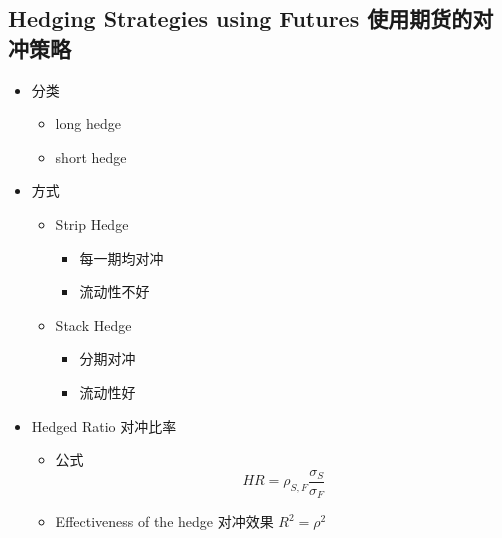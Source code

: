 \documentclass[a4paper,6pt,twoside,openany]{article}
\begin{document}
\subsection{Hedging Strategies using Futures 使用期货的对冲策略}
\begin{itemize}
\item 分类
  \begin{itemize}
  \item long hedge
  \item short hedge
  \end{itemize}
\item 方式
  \begin{itemize}
  \item Strip Hedge
    \begin{itemize}
    \item 每一期均对冲
    \item 流动性不好
    \end{itemize}
  \item Stack Hedge
    \begin{itemize}
    \item 分期对冲
    \item 流动性好
    \end{itemize}
  \end{itemize}
\item Hedged Ratio 对冲比率
  \begin{itemize}
  \item 公式 $$HR = \rho_{S,F}\frac{\sigma_S}{\sigma_F}$$
  \item Effectiveness of the hedge 对冲效果 $R^2 = \rho^2$
  \end{itemize}
\end{itemize}
\end{document}
